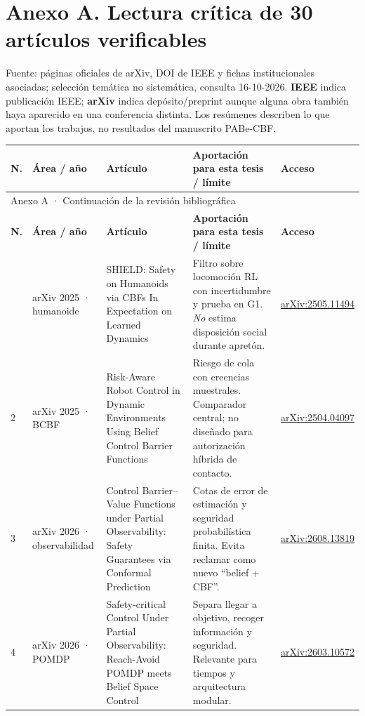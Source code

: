 \documentclass[10pt,a4paper,twocolumn]{article}
\newcommand{\arxiv}[1]{\href{https://arxiv.org/abs/#1}{arXiv:#1}}
\begin{document}
\section*{Anexo A. Lectura crítica de 30 artículos verificables}
\noindent\small Fuente: páginas oficiales de arXiv, DOI de IEEE y fichas institucionales asociadas; selección temática no sistemática, consulta 16-10-2026. \textbf{IEEE} indica publicación IEEE; \textbf{arXiv} indica depósito/preprint aunque alguna obra también haya aparecido en una conferencia distinta. Los resúmenes describen lo que aportan los trabajos, no resultados del manuscrito PABe-CBF.\normalsize
\vspace{7pt}
\small
\setlength{\LTpre}{3pt}\setlength{\LTpost}{5pt}
\setlength{\tabcolsep}{2.3pt}
\begin{longtable}{@{}p{7mm}p{22mm}p{60mm}p{49mm}p{25mm}@{}}
\toprule\textbf{N.} & \textbf{Área / año} & \textbf{Artículo} & \textbf{Aportación para esta tesis / límite} & \textbf{Acceso}\\\midrule
\endfirsthead
\multicolumn{5}{l}{\footnotesize Anexo A · Continuación de la revisión bibliográfica}\\\toprule\textbf{N.} & \textbf{Área / año} & \textbf{Artículo} & \textbf{Aportación para esta tesis / límite} & \textbf{Acceso}\\\midrule
\endhead
\bottomrule\endfoot
1 & arXiv 2025 · humanoide & SHIELD: Safety on Humanoids via CBFs In Expectation on Learned Dynamics & Filtro sobre locomoción RL con incertidumbre y prueba en G1. \emph{No} estima disposición social durante apretón. & \arxiv{2505.11494}\\
2 & arXiv 2025 · BCBF & Risk-Aware Robot Control in Dynamic Environments Using Belief Control Barrier Functions & Riesgo de cola con creencias muestrales. Comparador central; no diseñado para autorización híbrida de contacto. & \arxiv{2504.04097}\\
3 & arXiv 2026 · observabilidad & Control Barrier--Value Functions under Partial Observability: Safety Guarantees via Conformal Prediction & Cotas de error de estimación y seguridad probabilística finita. Evita reclamar como nuevo ``belief + CBF''. & \arxiv{2608.13819}\\
4 & arXiv 2026 · POMDP & Safety-critical Control Under Partial Observability: Reach-Avoid POMDP meets Belief Space Control & Separa llegar a objetivo, recoger información y seguridad. Relevante para tiempos y arquitectura modular. & \arxiv{2603.10572}\\

\end{longtable}
\end{document}
